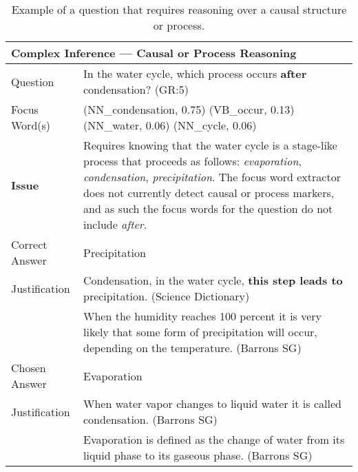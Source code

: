  
\begin{table}[]
\caption{{  Example of a question that requires reasoning over a causal structure or process. }} 
\begin{footnotesize}
\begin{tabularx}{\textwidth}{p{2.5cm}p{10cm}}
\hline
\multicolumn{2}{l}{Complex Inference --- Causal or Process Reasoning} \\
\hline
Question & In the water cycle, which process occurs {\bf after} condensation? (GR:5)  \\
Focus Word(s) & (NN\_condensation, 0.75) (VB\_occur, 0.13) (NN\_water, 0.06) (NN\_cycle, 0.06)\\
\textbf{Issue}		& Requires knowing that the water cycle is a stage-like process that proceeds as follows: \emph{evaporation}, \emph{condensation}, \emph{precipitation}.  The focus word extractor does not currently detect causal or process markers, and as such the focus words for the question do not include \emph{after}. \\ 
\hline
Correct Answer &  Precipitation \\
Justification 	& Condensation, in the water cycle, {\bf this step leads to} precipitation. (Science Dictionary)\\
 				& When the humidity reaches 100 percent it is very likely that some form of precipitation will occur, depending on the temperature. (Barrons SG)\\
\hline
Chosen Answer & Evaporation\\
Justification 	& When water vapor changes to liquid water it is called condensation. (Barrons SG)\\
 	& Evaporation is defined as the change of water from its liquid phase to its gaseous phase. (Barrons SG)\\
\hline
\end{tabularx}
\end{footnotesize}
\label{ex:structure}

\end{table}


 
